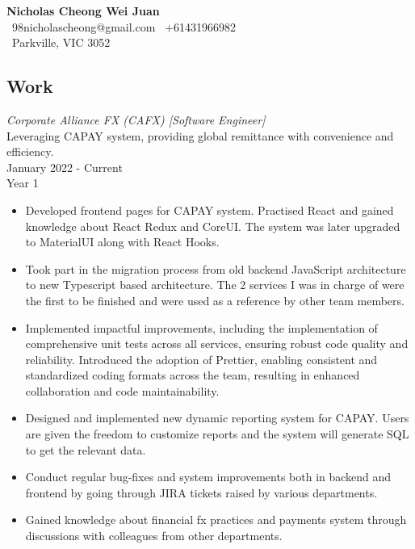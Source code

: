 \documentclass[10pt, a4paper]{cv}
\begin{document}
\noindent
{\LARGE \textbf{Nicholas Cheong Wei Juan}} \\
\noindent
\faEnvelope\ 98nicholascheong@gmail.com \hspace{25pt} \faPhone\ +61431966982 \\
\faHome\ Parkville, VIC 3052
\begin{paracol}{2}
	\begin{flushleft}

		\section*{Work}
		 {\sl Corporate Alliance FX (CAFX) [Software Engineer] } \\
		Leveraging CAPAY system, providing global remittance with convenience and efficiency.\\
		January 2022 - Current \\
		\vspace{6pt}
		\quad Year 1
		\begin{itemize}[ topsep=0pt] \itemsep -2pt
			\item Developed frontend pages for CAPAY system. Practised React and gained knowledge about React Redux and CoreUI. The system was later upgraded to MaterialUI along with React Hooks.
			\item Took part in the migration process from old backend JavaScript architecture to new Typescript based architecture. The 2 services I was in charge of were the first to be finished and were used as a reference by other team members.
			\item Implemented impactful improvements, including the implementation of comprehensive unit tests across all services, ensuring robust code quality and reliability. Introduced the adoption of Prettier, enabling consistent and standardized coding formats across the team, resulting in enhanced collaboration and code maintainability.
			\item Designed and implemented new dynamic reporting system for CAPAY. Users are given the freedom to customize reports and the system will generate SQL to get the relevant data.
			\item Conduct regular bug-fixes and system improvements both in backend and frontend by going through JIRA tickets raised by various departments.
			\item Gained knowledge about financial fx practices and payments system through discussions with colleagues from other departments.
		\end{itemize}

\end{flushleft}
\end{paracol}
\end{document}

